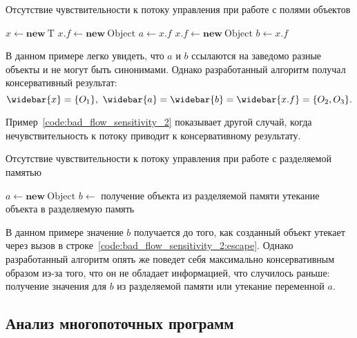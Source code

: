 \documentclass[14pt,titlepage,draft]{extarticle}
\newcommand{\type}[1]{\mathrm{#1}}
\newcommand{\op}[1]{\mathbf{#1}}
\newcommand{\pts}[1]{\widebar{#1}}
\begin{document}
      \begin{algorithm}
        \caption{Отсутствие чувствительности к потоку управления при работе с
          полями объектов}
        \label{code:bad_flow_sensitivity_1}
        \begin{algorithmic}[1]
          \State $x \gets \op{new}~\type{T}$
          \State $x.f \gets \op{new}~\type{Object}$
          \State $a \gets x.f$
          \State $x.f \gets \op{new}~\type{Object}$
          \State $b \gets x.f$
        \end{algorithmic}
      \end{algorithm}

      В данном примере легко увидеть, что $a$ и $b$ ссылаются на заведомо
      разные объекты и не могут быть синонимами. Однако разработанный алгоритм
      получал консервативный результат:
      \[ \pts{x} = \{O_1\},\ \pts{a} = \pts{b} = \pts{x.f} = \{O_2, O_3\}. \]

      Пример~\ref{code:bad_flow_sensitivity_2} показывает другой случай, когда
      нечувствительность к потоку приводит к консервативному результату.

      \begin{algorithm}
        \caption{Отсутствие чувствительности к потоку управления при работе с
          разделяемой памятью}
        \label{code:bad_flow_sensitivity_2}
        \begin{algorithmic}[1]
          \State $a \gets \op{new}~\type{Object}$
          \State $b \gets$ 
            \Comment получение объекта из разделяемой памяти
          \State {}
            \label{code:bad_flow_sensitivity_2:escape}
            \Comment утекание объекта в разделяемую память
        \end{algorithmic}
      \end{algorithm}

      В данном примере значение $b$ получается до того, как созданный объект
      утекает через вызов в строке~\ref{code:bad_flow_sensitivity_2:escape}.
      Однако разработанный алгоритм опять же поведет себя максимально
      консервативным образом из-за того, что он не обладает информацией, что
      случилось раньше: получение значения для $b$ из разделяемой памяти или
      утекание переменной $a$.

    \subsection{Анализ многопоточных программ}
\end{document}
